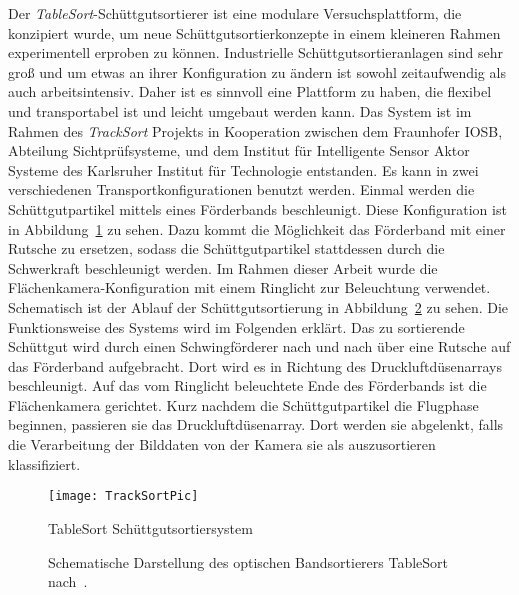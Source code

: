 Der \textit{TableSort}-Schüttgutsortierer ist eine modulare Versuchsplattform, die konzipiert wurde, um neue Schüttgutsortierkonzepte in einem kleineren Rahmen experimentell erproben zu können.
Industrielle Schüttgutsortieranlagen sind sehr groß und um etwas an ihrer Konfiguration zu ändern ist sowohl zeitaufwendig als auch arbeitsintensiv.
Daher ist es sinnvoll eine Plattform zu haben, die flexibel und transportabel ist und leicht umgebaut werden kann.
Das System ist im Rahmen des \textit{TrackSort} Projekts in Kooperation zwischen dem Fraunhofer IOSB, Abteilung Sichtprüfsysteme, und dem Institut für Intelligente Sensor Aktor Systeme des Karlsruher Institut für Technologie entstanden\cite{doll2015}.
Es kann in zwei verschiedenen Transportkonfigurationen benutzt werden.
Einmal werden die Schüttgutpartikel mittels eines Förderbands beschleunigt.
Diese Konfiguration ist in Abbildung~\ref{fig:tablesortsystem} zu sehen.
Dazu kommt die Möglichkeit das Förderband mit einer Rutsche zu ersetzen, sodass die Schüttgutpartikel stattdessen durch die Schwerkraft beschleunigt werden. 
Im Rahmen dieser Arbeit wurde die Flächenkamera-Konfiguration mit einem Ringlicht zur Beleuchtung verwendet.
Schematisch ist der Ablauf der Schüttgutsortierung in Abbildung~\ref{fig:aufbau_tablesort} zu sehen.
Die Funktionsweise des Systems wird im Folgenden erklärt.
Das zu sortierende Schüttgut wird durch einen Schwingförderer nach und nach über eine Rutsche auf das Förderband aufgebracht.
Dort wird es in Richtung des Druckluftdüsenarrays beschleunigt. 
Auf das vom Ringlicht beleuchtete Ende des Förderbands ist die Flächenkamera gerichtet.
Kurz nachdem die Schüttgutpartikel die Flugphase beginnen, passieren sie das Druckluftdüsenarray.
Dort werden sie abgelenkt, falls die Verarbeitung der Bilddaten von der Kamera sie als auszusortieren klassifiziert.

\begin{figure}[h]
	\texttt{[image: TrackSortPic]}
	\caption{TableSort Schüttgutsortiersystem \cite{fraunhoferiosb2017}}
	\label{fig:tablesortsystem}
\end{figure}


\begin{figure}[h]
    \centering
    \def\svgwidth{\columnwidth}
	
	\caption[Schematische Darstellung des optischen Bandsortierers TableSort nach~\cite{Pfaff2017}.]{
		Schematische Darstellung des optischen Bandsortierers TableSort nach~\cite{Pfaff2017}.
	}
	\label{fig:aufbau_tablesort}

\end{figure}


